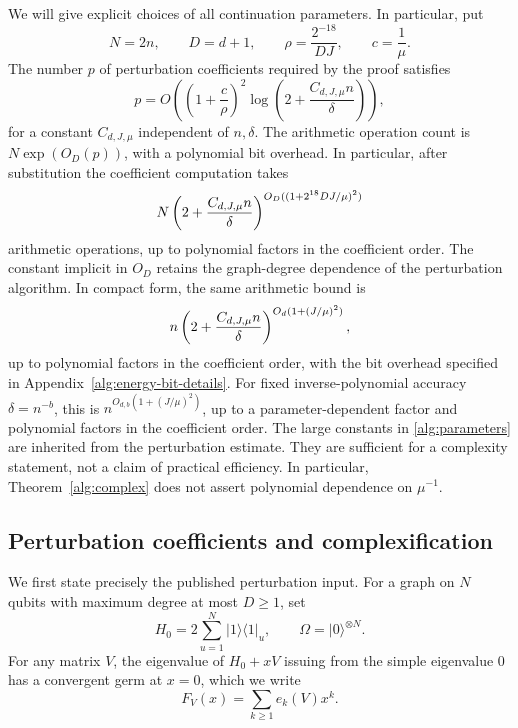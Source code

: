\documentclass[reqno]{amsart}
\theoremstyle{definition}
\theoremstyle{remark}
\begin{document}
We will give explicit choices of all continuation parameters.  In
particular, put
\begin{equation}
 N=2n,\qquad D=d+1,\qquad
 \rho=\frac{2^{-18}}{DJ},\qquad c=\frac1\mu.
 \label{alg:parameters}
\end{equation}
The number \(p\) of perturbation coefficients required by the proof
satisfies
\begin{equation}
 p=O\!\left(
   \left(1+\frac{c}{\rho}\right)^2
   \log\!\left(2+\frac{C_{d,J,\mu}n}{\delta}\right)
 \right),
 \label{alg:order-bound}
\end{equation}
for a constant \(C_{d,J,\mu}\) independent of \(n,\delta\).
The arithmetic operation count is
\(N\exp(O_D(p))\), with a polynomial bit overhead.
In particular, after substitution the coefficient computation takes
\[
 N\left(2+\frac{C_{d,J,\mu}n}{\delta}\right)^%
 {O_D((1+2^{18}DJ/\mu)^2)}
\]
arithmetic operations, up to polynomial factors in the coefficient
order. The constant implicit in \(O_D\) retains the graph-degree
dependence of the perturbation algorithm.
In compact form, the same arithmetic bound is
\[
 n\left(2+\frac{C_{d,J,\mu}n}{\delta}\right)^%
 {O_d(1+(J/\mu)^2)},
\]
up to polynomial factors in the coefficient order, with the bit
overhead specified in Appendix~\ref{alg:energy-bit-details}.
For fixed inverse-polynomial accuracy \(\delta=n^{-b}\), this is
\(n^{O_{d,b}(1+(J/\mu)^2)}\), up to a parameter-dependent factor
and polynomial factors in the coefficient order.
The large constants in \eqref{alg:parameters} are inherited from
the perturbation estimate.  They are sufficient for a complexity
statement, not a claim of practical efficiency.  In particular,
Theorem~\ref{alg:complex} does not assert polynomial dependence
on \(\mu^{-1}\).

\subsection{Perturbation coefficients and complexification}
\label{alg:perturbation-subsection}

We first state precisely the published perturbation input.
For a graph on \(N\) qubits with maximum degree at most \(D\ge1\), set
\begin{equation}
 H_0=2\sum_{u=1}^N |1\rangle\langle1|_u,
 \qquad \Omega=|0\rangle^{\otimes N}.
 \label{alg:unperturbed}
\end{equation}
For any matrix \(V\), the eigenvalue of \(H_0+xV\) issuing from the
simple eigenvalue \(0\) has a convergent germ at \(x=0\), which we write
\begin{equation}
 F_V(x)=\sum_{k\ge1}e_k(V)x^k.
 \label{alg:energy-germ}
\end{equation}
\end{document}
